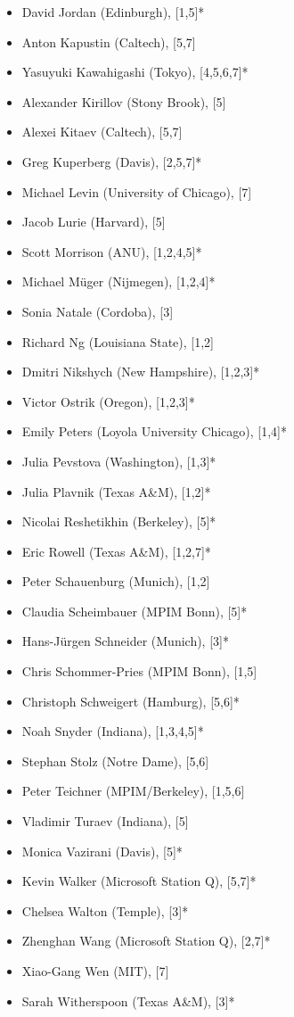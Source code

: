 \documentclass[12pt]{article}
\begin{document}
\begin{multicols}{2}
\begin{itemize}
\item David Jordan (Edinburgh), [1,5]*
\item Anton Kapustin (Caltech), [5,7]
\item Yasuyuki Kawahigashi (Tokyo), [4,5,6,7]*
\item Alexander Kirillov (Stony Brook), [5]
\item Alexei Kitaev (Caltech), [5,7]
\item Greg Kuperberg (Davis), [2,5,7]*
\item Michael Levin (University of Chicago), [7]
\item Jacob Lurie (Harvard), [5]
\item Scott Morrison (ANU), [1,2,4,5]*
\item Michael M\"uger (Nijmegen), [1,2,4]*
\item Sonia Natale (Cordoba), [3]
\item Richard Ng (Louisiana State), [1,2]
\item Dmitri Nikshych (New Hampshire), [1,2,3]*
\item Victor Ostrik (Oregon), [1,2,3]*
\item Emily Peters (Loyola University Chicago), [1,4]*
\item Julia Pevstova (Washington), [1,3]*
\item Julia Plavnik (Texas A\&M), [1,2]*
\item Nicolai Reshetikhin (Berkeley), [5]*
\item Eric Rowell (Texas A\&M), [1,2,7]*
\item Peter Schauenburg (Munich), [1,2]
\item Claudia Scheimbauer (MPIM Bonn), [5]*
\item Hans-J\"urgen Schneider (Munich), [3]*
\item Chris Schommer-Pries (MPIM Bonn), [1,5]
\item Christoph Schweigert (Hamburg), [5,6]*
\item Noah Snyder (Indiana), [1,3,4,5]*
\item Stephan Stolz (Notre Dame), [5,6]
\item Peter Teichner (MPIM/Berkeley), [1,5,6]
\item Vladimir Turaev (Indiana), [5]
\item Monica Vazirani (Davis), [5]*
\item Kevin Walker (Microsoft Station Q), [5,7]*
\item Chelsea Walton (Temple), [3]*
\item Zhenghan Wang (Microsoft Station Q), [2,7]*
\item Xiao-Gang Wen (MIT), [7]
\item Sarah Witherspoon (Texas A\&M), [3]*
\end{itemize}
\end{multicols}
\end{document}
